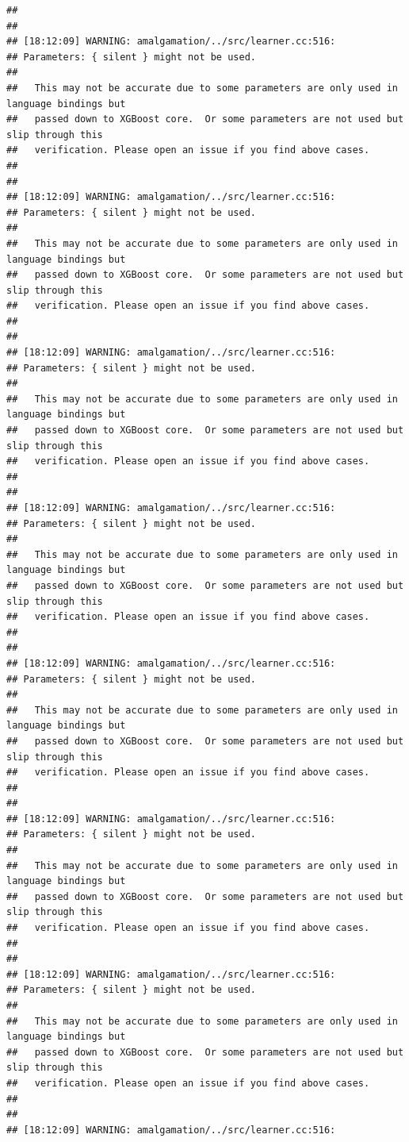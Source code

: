 \documentclass[AMS,STIX2COL]{WileyNJD-v2}\usepackage[]{graphicx}\usepackage[]{color}
\makeatletter
\newenvironment{kframe}{%
 \def\at@end@of@kframe{}%
 \ifinner\ifhmode%
  \def\at@end@of@kframe{\end{minipage}}%
  \begin{minipage}{\columnwidth}%
 \fi\fi%
 \def\FrameCommand##1{\hskip\@totalleftmargin \hskip-\fboxsep
 \colorbox{shadecolor}{##1}\hskip-\fboxsep
     \hskip-\linewidth \hskip-\@totalleftmargin \hskip\columnwidth}%
 \MakeFramed {\advance\hsize-\width
   \@totalleftmargin\z@ \linewidth\hsize
   \@setminipage}}%
 {\par\unskip\endMakeFramed%
 \at@end@of@kframe}
\newenvironment{knitrout}{}{} %
\makeatother
\begin{document}
\begin{knitrout}
\begin{kframe}
\begin{verbatim}
## 
## 
## [18:12:09] WARNING: amalgamation/../src/learner.cc:516: 
## Parameters: { silent } might not be used.
## 
##   This may not be accurate due to some parameters are only used in language bindings but
##   passed down to XGBoost core.  Or some parameters are not used but slip through this
##   verification. Please open an issue if you find above cases.
## 
## 
## [18:12:09] WARNING: amalgamation/../src/learner.cc:516: 
## Parameters: { silent } might not be used.
## 
##   This may not be accurate due to some parameters are only used in language bindings but
##   passed down to XGBoost core.  Or some parameters are not used but slip through this
##   verification. Please open an issue if you find above cases.
## 
## 
## [18:12:09] WARNING: amalgamation/../src/learner.cc:516: 
## Parameters: { silent } might not be used.
## 
##   This may not be accurate due to some parameters are only used in language bindings but
##   passed down to XGBoost core.  Or some parameters are not used but slip through this
##   verification. Please open an issue if you find above cases.
## 
## 
## [18:12:09] WARNING: amalgamation/../src/learner.cc:516: 
## Parameters: { silent } might not be used.
## 
##   This may not be accurate due to some parameters are only used in language bindings but
##   passed down to XGBoost core.  Or some parameters are not used but slip through this
##   verification. Please open an issue if you find above cases.
## 
## 
## [18:12:09] WARNING: amalgamation/../src/learner.cc:516: 
## Parameters: { silent } might not be used.
## 
##   This may not be accurate due to some parameters are only used in language bindings but
##   passed down to XGBoost core.  Or some parameters are not used but slip through this
##   verification. Please open an issue if you find above cases.
## 
## 
## [18:12:09] WARNING: amalgamation/../src/learner.cc:516: 
## Parameters: { silent } might not be used.
## 
##   This may not be accurate due to some parameters are only used in language bindings but
##   passed down to XGBoost core.  Or some parameters are not used but slip through this
##   verification. Please open an issue if you find above cases.
## 
## 
## [18:12:09] WARNING: amalgamation/../src/learner.cc:516: 
## Parameters: { silent } might not be used.
## 
##   This may not be accurate due to some parameters are only used in language bindings but
##   passed down to XGBoost core.  Or some parameters are not used but slip through this
##   verification. Please open an issue if you find above cases.
## 
## 
## [18:12:09] WARNING: amalgamation/../src/learner.cc:516: 

\end{verbatim}
\end{kframe}
\end{knitrout}
\end{document}
